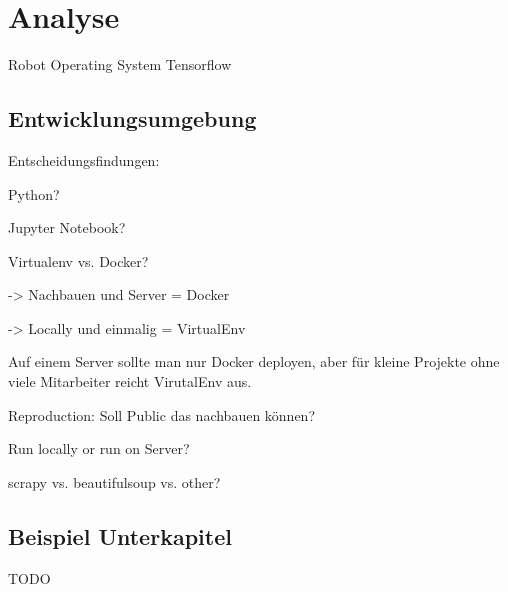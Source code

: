 \chapter{Analyse}
Robot Operating System \cite{288}
\newline
Tensorflow \cite{Abadi:2016:TSL:3026877.3026899}

\section{Entwicklungsumgebung}
Entscheidungsfindungen: 

\begin{compactitem}
\item Python?
\item Jupyter Notebook?
\item Virtualenv vs. Docker?
\item -> Nachbauen und Server = Docker
\item -> Locally und einmalig = VirtualEnv
\item Auf einem Server sollte man nur Docker deployen, aber für kleine Projekte ohne viele Mitarbeiter reicht VirutalEnv aus.
\item Reproduction: Soll Public das nachbauen können?
\item Run locally or run on Server?
\item scrapy vs. beautifulsoup vs. other?
\end{compactitem}

\begin{compactitem}
\end{compactitem}
\section{Beispiel Unterkapitel}
TODO